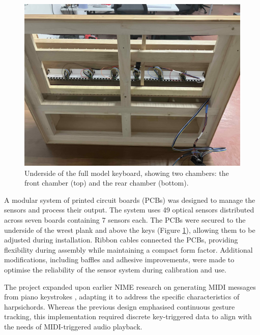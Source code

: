 
\begin{figure}
  \centering
  \includegraphics[width=\linewidth]{src/images/49-key-bottom-sensors-no-keys.jpg} 
  \caption{Underside of the full model keyboard, showing two chambers: the front chamber (top) and the rear chamber (bottom).} 
  \Description{} 
  \label{fig:49-key-bottom}
\end{figure}

A modular system of printed circuit boards (PCBs) was designed to manage the sensors and process their output. The system uses 49 optical sensors distributed across seven boards containing 7 sensors each. The PCBs were secured to the underside of the wrest plank and above the keys (Figure \ref{fig:49-key-bottom}), allowing them to be adjusted during installation. Ribbon cables connected the PCBs, providing flexibility during assembly while maintaining a compact form factor. Additional modifications, including baffles and adhesive improvements, were made to optimise the reliability of the sensor system during calibration and use.

The project expanded upon earlier NIME research on generating MIDI messages from piano keystrokes \cite{McPherson2013}, adapting it to address the specific characteristics of harpsichords. Whereas the previous design emphasised continuous gesture tracking, this implementation required discrete key-triggered data to align with the needs of MIDI-triggered audio playback. 

